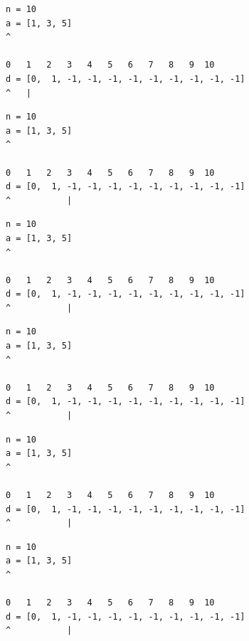 \begin{frame}[fragile]
\begin{verbatim}
n = 10
a = [1, 3, 5]
^

0   1   2   3   4   5   6   7   8   9  10
d = [0,  1, -1, -1, -1, -1, -1, -1, -1, -1, -1]
^   |
\end{verbatim}
\end{frame}
\addtocounter{framenumber}{-1}

\begin{frame}[fragile]
\begin{verbatim}
n = 10
a = [1, 3, 5]
^

0   1   2   3   4   5   6   7   8   9  10
d = [0,  1, -1, -1, -1, -1, -1, -1, -1, -1, -1]
^           |
\end{verbatim}
\end{frame}
\addtocounter{framenumber}{-1}

\begin{frame}[fragile]
\begin{verbatim}
n = 10
a = [1, 3, 5]
^

0   1   2   3   4   5   6   7   8   9  10
d = [0,  1, -1, -1, -1, -1, -1, -1, -1, -1, -1]
^           |
\end{verbatim}
\end{frame}
\addtocounter{framenumber}{-1}

\begin{frame}[fragile]
\begin{verbatim}
n = 10
a = [1, 3, 5]
^

0   1   2   3   4   5   6   7   8   9  10
d = [0,  1, -1, -1, -1, -1, -1, -1, -1, -1, -1]
^           |
\end{verbatim}
\end{frame}
\addtocounter{framenumber}{-1}

\begin{frame}[fragile]
\begin{verbatim}
n = 10
a = [1, 3, 5]
^

0   1   2   3   4   5   6   7   8   9  10
d = [0,  1, -1, -1, -1, -1, -1, -1, -1, -1, -1]
^           |
\end{verbatim}
\end{frame}
\addtocounter{framenumber}{-1}

\begin{frame}[fragile]
\begin{verbatim}
n = 10
a = [1, 3, 5]
^

0   1   2   3   4   5   6   7   8   9  10
d = [0,  1, -1, -1, -1, -1, -1, -1, -1, -1, -1]
^           |
\end{verbatim}
\end{frame}
\addtocounter{framenumber}{-1}

